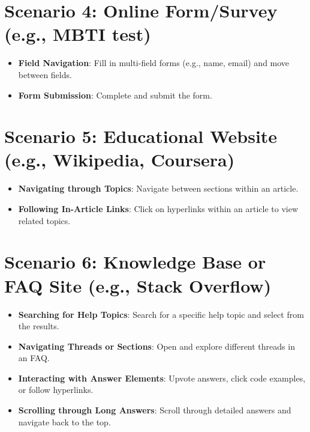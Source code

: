 \documentclass[letterpaper, 12pt]{article}
\begin{document}
\section*{Scenario 4: Online Form/Survey (e.g., MBTI test)}
\begin{itemize}
    \item \textbf{Field Navigation}: Fill in multi-field forms (e.g., name, email) and move between fields.
    \item \textbf{Form Submission}: Complete and submit the form.
\end{itemize}


\section*{Scenario 5: Educational Website (e.g., Wikipedia, Coursera)}
\begin{itemize}
    \item \textbf{Navigating through Topics}: Navigate between sections within an article.
    \item \textbf{Following In-Article Links}: Click on hyperlinks within an article to view related topics.
\end{itemize}


\section*{Scenario 6: Knowledge Base or FAQ Site (e.g., Stack Overflow)}
\begin{itemize}
    \item \textbf{Searching for Help Topics}: Search for a specific help topic and select from the results.
    \item \textbf{Navigating Threads or Sections}: Open and explore different threads in an FAQ.
    \item \textbf{Interacting with Answer Elements}: Upvote answers, click code examples, or follow hyperlinks.
    \item \textbf{Scrolling through Long Answers}: Scroll through detailed answers and navigate back to the top.
\end{itemize}
\end{document}
